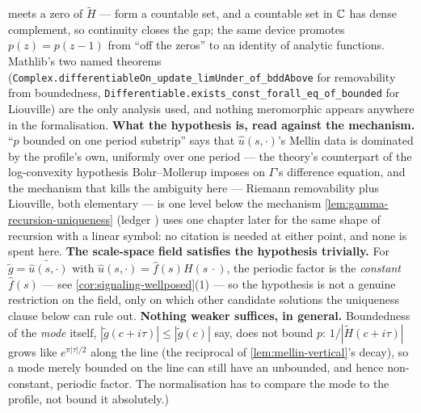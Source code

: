\begin{lemma}
{meets a zero of $\tilde H$ --- form a countable set, and a countable set in $\mathbb{C}$ has dense
complement, so continuity closes the gap; the same device promotes $p(z) = p(z-1)$ from ``off the
zeros'' to an identity of analytic functions. Mathlib's two named theorems
(\texttt{Complex.differentiableOn\_update\_limUnder\_of\_bddAbove} for removability from
boundedness, \texttt{Differentiable.exists\_const\_forall\_eq\_of\_bounded} for Liouville) are the
only analysis used, and nothing meromorphic appears anywhere in the formalisation.
\textbf{What the hypothesis is, read against the mechanism.} ``$p$ bounded on one period
substrip'' says that $\hat u(s,\cdot)$'s Mellin data is dominated by the profile's own, uniformly
over one period --- the theory's counterpart of the log-convexity hypothesis Bohr--Mollerup
imposes on $\Gamma$'s difference equation, and the mechanism that kills the ambiguity here ---
Riemann removability plus Liouville, both elementary --- is one level below the mechanism
\ref{lem:gamma-recursion-uniqueness} (ledger ) uses one chapter later for the same
shape of recursion with a linear symbol: no citation is needed at either point, and none is spent
here. \textbf{The scale-space field satisfies the hypothesis trivially.} For
$\tilde g = \widetilde{\hat u(s,\cdot)}$ with $\hat u(s,\cdot) = \hat f(s)H(s\,\cdot)$, the periodic
factor is the \emph{constant} $\hat f(s)$ --- see \ref{cor:signaling-wellposed}(1) --- so the
hypothesis is not a genuine restriction on the field, only on which other candidate solutions the
uniqueness clause below can rule out.
\textbf{Nothing weaker suffices, in general.} Boundedness of the \emph{mode} itself,
$|\tilde g(c+i\tau)| \le |\tilde g(c)|$ say, does not bound $p$: $1/|\tilde H(c+i\tau)|$ grows like
$e^{\pi|\tau|/2}$ along the line (the reciprocal of \ref{lem:mellin-vertical}'s decay), so a mode
merely bounded on the line can still have an unbounded, and hence non-constant, periodic factor.
The normalisation has to compare the mode to the profile, not bound it absolutely.)}
\end{lemma}

